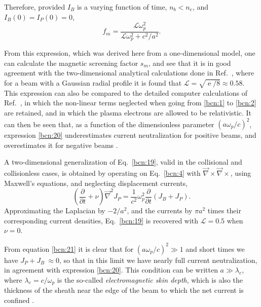 \documentclass [12pt,a4paper,     ]{report} %
\newcommand{\e  }{\operatorname{e}}   %
\begin{document}
Therefore, provided $I_B$ is a varying function of time, $n_b < n_e$, and $I_B(0)=I_P(0)=0$,
%
\begin{equation}\label{bcn:20} %
               f_m =  \frac{\mathcal{L}\omega_p^2}
                           {\mathcal{L}\omega_p^2 + c^2/a^2}.
\end{equation}
%

From this expression, which was derived here from a one-dimensional model, one can calculate the magnetic screening factor $s_m $, and see that it is in good agreement with the two-dimensional analytical calculations done in Ref.~\cite{KUPPE1973A}, where for a beam with a Gaussian radial profile it is found that $\mathcal{L}=\sqrt{\e/8} \approx 0.58$.  This expression can also be compared to the detailed computer calculations of Ref.~\cite{LOTOV1996-}, in which the non-linear terms neglected when going from \eqref{bcn:1} to \eqref{bcn:2} are retained, and in which the plasma electrons are allowed to be relativistic. It can then be seen that, as a function of the dimensionless parameter $(a\omega_p/c)^2$, expression \eqref{bcn:20} underestimates current neutralization for positive beams, and overestimates it for negative beams \cite[Fig.7]{LOTOV1996-}.

   A two-dimensional generalization of Eq.~\eqref{bcn:19}, valid in the collisional and collisionless cases, is obtained by operating on Eq.~\eqref{bcn:4} with $\vec{\nabla}\times\vec{\nabla}\times$, using Maxwell's equations, and neglecting displacement currents, 
%
\begin{equation}\label{bcn:21} %
    (\frac{\partial}{\partial t} + \nu) \vec{\nabla}^2 J_P
       =  \frac{1}{c^2} \omega_p^2
          \frac{\partial}{\partial t}(J_B + J_P).
\end{equation}
%
Approximating the Laplacian by $-2/a^2$, and the currents by $\pi a^2$ times their corresponding current densities,  Eq.~\eqref{bcn:19} is recovered with $\mathcal{L}=0.5$ when $\nu=0$.

   From equation \eqref{bcn:21} it is clear that for $(a\omega_p/c)^2 \gg 1$ and short times we have $J_P+J_B\ \approx 0$, so that in this limit we have nearly full current neutralization, in agreement with expression \eqref{bcn:20}.  This condition can be written $a \gg \lambda_e$, where $\lambda_e = c/\omega_p$ is the so-called \emph{electromagnetic skin depth}, which is also the thickness of the sheath near the edge of the beam to which the net current is confined \cite{HAMME1970-}.
\end{document}
